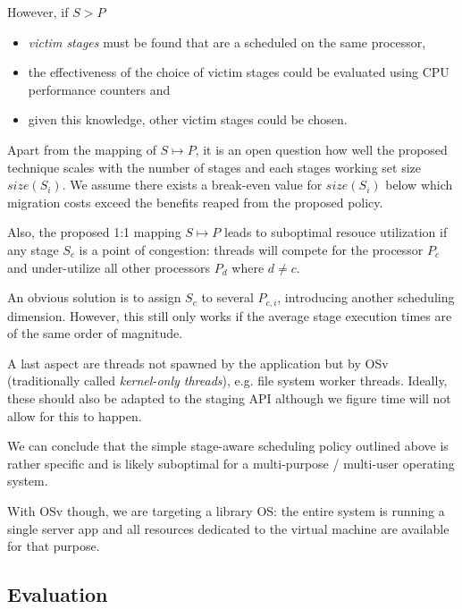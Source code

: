 \documentclass{article}
\begin{document}
However, if $S > P$
\begin{itemize}
    \item \textit{victim stages} must be found that are a scheduled on the same processor,
    \item the effectiveness of the choice of victim stages could be evaluated using CPU performance counters and
    \item given this knowledge, other victim stages could be chosen.  
\end{itemize}

Apart from the mapping of $S \mapsto P$, it is an open question how well the proposed technique scales with the number of stages and each stages working set size $size(S_i)$.
We assume there exists a break-even value for $size(S_i)$ below which migration costs exceed the benefits reaped from the proposed policy.

Also, the proposed 1:1 mapping $S \mapsto P$ leads to suboptimal resouce utilization if any stage $S_c$ is a point of congestion:
threads will compete for the processor $P_c$ and under-utilize all other processors $P_d$ where $d \ne c$.

An obvious solution is to assign $S_c$ to several $P_{c,i}$, introducing another scheduling dimension.
However, this still only works if the average stage execution times are of the same order of magnitude.

A last aspect are threads not spawned by the application but by OSv (traditionally called \emph{kernel-only threads}),
e.g. file system worker threads.
Ideally, these should also be adapted to the staging API although we figure time will not allow for this to happen.

We can conclude that the simple stage-aware scheduling policy outlined above is rather specific and
is likely suboptimal for a multi-purpose / multi-user operating system.

With OSv though, we are targeting a library OS:
the entire system is running a single server app and all resources dedicated to the virtual machine are available for that purpose.

\subsection{Evaluation}\label{evaluation}
\end{document}

